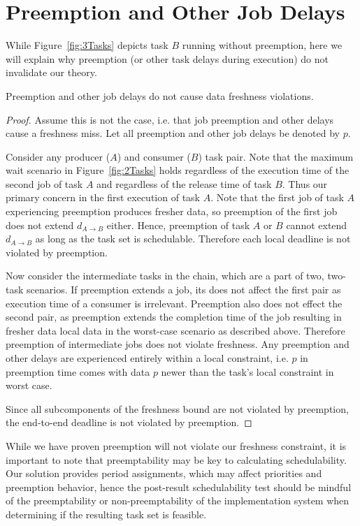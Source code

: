 \section{Preemption and Other Job Delays}

While Figure~\ref{fig:3Tasks} depicts task $B$ running without preemption, here we will explain why preemption (or other task delays during execution) do not invalidate our theory.

\begin{theorem}
	Preemption and other job delays do not cause data freshness violations.
\end{theorem}

\begin{proof}
	Assume this is not the case, i.e. that job preemption and other delays cause a freshness miss. Let all preemption and other job delays be denoted by $p$.
	
	Consider any producer ($A$) and consumer ($B$) task pair. Note that the maximum wait scenario in Figure~\ref{fig:2Tasks} holds regardless of the execution time of the second job of task $A$ and regardless of the release time of task $B$. Thus our primary concern in the first execution of task $A$. Note that the first job of task $A$ experiencing preemption produces fresher data, so preemption of the first job does not extend $d_{A \to B}$ either. Hence, preemption of task $A$ or $B$ cannot extend $d_{A \to B}$ as long as the task set is schedulable. Therefore each local deadline is not violated by preemption.
	
	Now consider the intermediate tasks in the chain, which are a part of two, two-task scenarios. If preemption extends a job, its does not affect the first pair as execution time of a consumer is irrelevant. Preemption also does not effect the second pair, as preemption extends the completion time of the job resulting in fresher data local data in the worst-case scenario as described above. Therefore preemption of intermediate jobs does not violate freshness. Any preemption and other delays are experienced entirely within a local constraint, i.e. $p$ in preemption time comes with data $p$ newer than the task's local constraint in worst case.
	
	Since all subcomponents of the freshness bound are not violated by preemption, the end-to-end deadline is not violated by preemption.
\end{proof}

While we have proven preemption will not violate our freshness constraint, it is important to note that preemptability may be key to calculating schedulability. Our solution provides period assignments, which may affect priorities and preemption behavior, hence the post-result schedulability test should be mindful of the preemptability or non-preemptability of the implementation system when determining if the resulting task set is feasible.